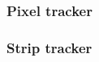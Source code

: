 \subsubsection{Pixel tracker} \label{sec:PixelTracker}

\subsubsection{Strip tracker} \label{sec:StripTracker}